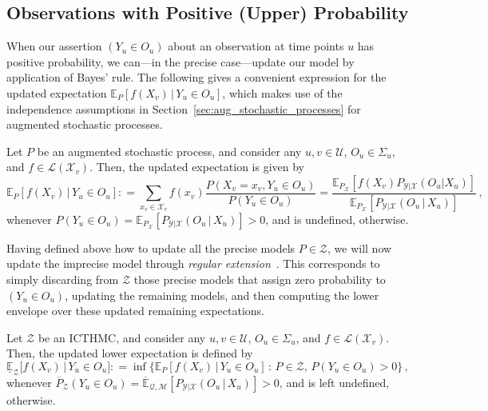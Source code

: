 \documentclass[twoside,11pt]{article}
\newcommand{\states}{\mathcal{X}}
\newcommand{\observs}{\mathcal{Y}}
\newcommand{\uexp}{\overline{\mathbb{E}}_{\rateset,\mathcal{M}}}
\newcommand{\gambles}{\mathcal{L}}
\newcommand{\rateset}{\mathcal{Q}}
\newcommand{\coloneqq}{:\!=}
\begin{document}
\subsection{Observations with Positive (Upper) Probability}\label{subsec:pos_prob}

When our assertion $(Y_u\in O_u)$ about an observation at time points $u$ has positive probability, we can---in the precise case---update our model by application of Bayes' rule. The following gives a convenient expression for the updated expectation $\mathbb{E}_P[f(X_v)\,\vert\,Y_u\in O_u]$, which makes use of the independence assumptions in Section~\ref{sec:aug_stochastic_processes} for augmented stochastic processes.

\begin{proposition}\label{prop:precise_conditioning_for_positive}
Let $P$ be an augmented stochastic process, and consider any $u,v\in\mathcal{U}$, $O_u\in\Sigma_u$, and $f\in\gambles(\states_v)$. Then, the updated expectation is given by
\begin{equation*}
\mathbb{E}_P[f(X_v)\,\vert\,Y_u\in O_u] \coloneqq \sum_{x_v\in\states_v}f(x_v)\frac{P(X_v=x_v, Y_u\in O_u)}{P(Y_u\in O_u)} = \frac{\mathbb{E}_{P_\states}[f(X_v)P_{\observs\vert\states}(O_u\vert X_u)]}{\mathbb{E}_{P_\states}[P_{\observs\vert\states}(O_u\,\vert\,X_u)]}\,,
\end{equation*}
whenever $P(Y_u\in O_u)=\mathbb{E}_{P_\states}[P_{\observs\vert\states}(O_u\,\vert\,X_u)]>0$, and is undefined, otherwise.
\end{proposition}

Having defined above how to update all the precise models $P\in\mathcal{Z}$, we will now update the imprecise model through \emph{regular extension}~\citep{Walley:1991vk}. This corresponds to simply discarding from $\mathcal{Z}$ those precise models that assign zero probability to $(Y_u\in O_u)$, updating the remaining models, and then computing the lower envelope over these updated remaining expectations.

\begin{definition}\label{def:reg_ext_pos}
Let $\mathcal{Z}$ be an ICTHMC, and consider any $u,v\in\mathcal{U}$, $O_u\in\Sigma_u$, and $f\in\gambles(\states_v)$. Then, the updated lower expectation is defined by
\begin{equation*}
\underline{\mathbb{E}}_{\mathcal{Z}}\bigl[f(X_v)\,\vert\,Y_u\in O_u\bigr] \coloneqq \inf\bigl\{ \mathbb{E}_P[f(X_v)\,\vert\,Y_u\in O_u]\,:\, P\in\mathcal{Z},\, P(Y_u\in O_u)>0 \bigr\}\,,
\end{equation*}
whenever $\overline{P}_\mathcal{Z}(Y_u\in O_u)=\uexp[P_{\observs\vert\states}(O_u\,\vert\,X_u)]>0$, and is left undefined, otherwise.
%
\end{definition}
\end{document}
